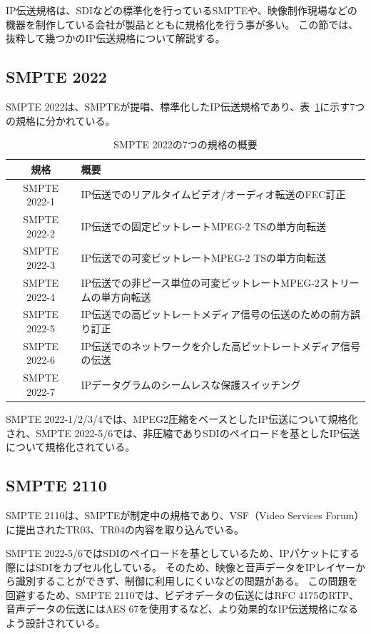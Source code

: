 IP伝送規格は、SDIなどの標準化を行っているSMPTEや、映像制作現場などの機器を制作している会社が製品とともに規格化を行う事が多い。
この節では、抜粋して幾つかのIP伝送規格について解説する。

\subsection{SMPTE 2022}
SMPTE 2022\cite{smpte-2022}は、SMPTEが提唱、標準化したIP伝送規格であり、表~\ref{tb:smpte2022-abstract}に示す7つの規格に分かれている。

\begin{table}[htbp]
  \caption{SMPTE 2022の7つの規格の概要}
  \label{tb:smpte2022-abstract}
  \begin{center}
  \begin{tabular}{c|l}
    \hline
    規格          & 概要 \\\hline\hline
    SMPTE 2022-1 & IP伝送でのリアルタイムビデオ/オーディオ転送のFEC訂正 \\\hline
    SMPTE 2022-2 & IP伝送での固定ビットレートMPEG-2 TSの単方向転送 \\\hline
    SMPTE 2022-3 & IP伝送での可変ビットレートMPEG-2 TSの単方向転送 \\\hline
    SMPTE 2022-4 & IP伝送での非ピース単位の可変ビットレートMPEG-2ストリームの単方向転送 \\\hline
    SMPTE 2022-5 & IP伝送での高ビットレートメディア信号の伝送のための前方誤り訂正 \\\hline
    SMPTE 2022-6 & IP伝送でのネットワークを介した高ビットレートメディア信号の伝送 \\\hline
    SMPTE 2022-7 & IPデータグラムのシームレスな保護スイッチング \\\hline
  \end{tabular}\end{center}
\end{table}

SMPTE 2022-1/2/3/4では、MPEG2圧縮をベースとしたIP伝送について規格化され、SMPTE 2022-5/6では、非圧縮でありSDIのペイロードを基としたIP伝送について規格化されている。

\subsection{SMPTE 2110}
SMPTE 2110\cite{smpte-2110}は、SMPTEが制定中の規格であり、VSF（Video Services Forum）に提出されたTR03、TR04の内容を取り込んでいる。

SMPTE 2022-5/6ではSDIのペイロードを基としているため、IPパケットにする際にはSDIをカプセル化している。
そのため、映像と音声データをIPレイヤーから識別することができず、制御に利用しにくいなどの問題がある。
この問題を回避するため、SMPTE 2110では、ビデオデータの伝送にはRFC 4175\cite{rfc4175}のRTP、音声データの伝送にはAES 67を使用するなど、より効果的なIP伝送規格になるよう設計されている。

